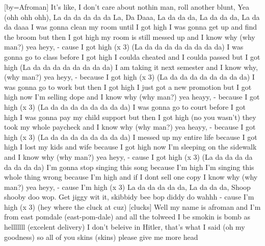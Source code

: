 [by={Afroman}]
\beginverse*\singlespacing
It's like, I don't care about nothin man,
roll another blunt, Yea (ohh ohh ohh),
\endverse
\beginverse*\singlespacing
La da da da da da La, Da Daaa,
La da da da, La da da da, La da da daaa
\endverse
\beginverse*\singlespacing
I was gonna clean my room until I got high
I was gonna get up and find the broom but then I got high
my room is still messed up and I know why (why man?) yea heyy,
- cause I got high (x 3)
\endverse
\beginverse*\singlespacing
(La da da da da da da da da)
\endverse
\beginverse*\singlespacing
I was gonna go to class before I got high
I coulda cheated and I coulda passed but I got high
(La da da da da da da da da)
I am taking it next semester and I know why, (why man?) yea heyy,
- because I got high (x 3)
\endverse
\beginverse*\singlespacing
(La da da da da da da da da)
\endverse
\beginverse*\singlespacing
I was gonna go to work but then I got high
I just got a new promotion but I got high
now I'm selling dope and I know why (why man?) yea heayy,
- because I got high (x 3)
\endverse
\beginverse*\singlespacing
(La da da da da da da da da)
\endverse
\beginverse*\singlespacing
I was gonna go to court before I got high
I was gonna pay my child support but then I got high (no you wasn't)
they took my whole paycheck and I know why (why man?) yea heayy,
- because I got high (x 3)
\endverse
\beginverse*\singlespacing
(La da da da da da da da da)
\endverse
\beginverse*\singlespacing
I messed up my entire life because I got high
I lost my kids and wife because I got high
now I'm sleeping on the sidewalk and I know why (why man?) yea heyy,
- cause I got high (x 3)
\endverse
\beginverse*\singlespacing
(La da da da da da da da da)
\endverse
\beginverse*\singlespacing
I'm gonna stop singing this song because I'm high
I'm singing this whole thing wrong because I'm high
and if I dont sell one copy I know why (why man?) yea heyy,
- cause I'm high (x 3)
\endverse
\beginverse*\singlespacing
La da da da da da, La da da da, Shoop shooby doo wop.
\endverse
\beginverse*\singlespacing
Get jiggy wit it, skibbidy bee bop diddy do wahhh
\endverse
\beginverse*\singlespacing
- cause I'm high (x 3)
\endverse
\beginverse*\singlespacing
(hey where the cluck at cuz) [clucks]
\endverse
\beginverse*\singlespacing
Well my name is afroman and I'm from east pomdale (east-pom-dale)
and all the tolweed I be smokin is bomb as helllllll (excelent delivery)
I don't beleive in Hitler, that's what I said (oh my goodness)
so all of you skins (skins) please give me more head 
\endverse
\endsong